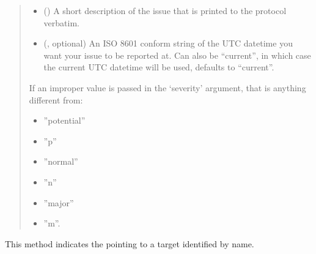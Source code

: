 \documentclass[letterpaper,10pt,english]{sphinxmanual}
\begin{document}
\begin{fulllineitems}
\begin{fulllineitems}
\begin{quote}
\begin{description}
\begin{itemize}
\begin{itemize}
\end{itemize}


\item {} 
\sphinxAtStartPar
{} () \textendash{} A short description of the issue that is printed to the protocol
verbatim.

\item {} 
\sphinxAtStartPar
{} (, optional) \textendash{} An ISO 8601 conform string of the UTC datetime you want your
issue to be reported at. Can also be “current”, in which case the
current UTC datetime will be used, defaults to “current”.

\end{itemize}

\sphinxAtStartPar
{} \textendash{} 
\sphinxAtStartPar
If an improper value is passed in the ‘severity’ argument, that is
anything different from:
\begin{itemize}
\item {} 
\sphinxAtStartPar
”potential”

\item {} 
\sphinxAtStartPar
”p”

\item {} 
\sphinxAtStartPar
”normal”

\item {} 
\sphinxAtStartPar
”n”

\item {} 
\sphinxAtStartPar
”major”

\item {} 
\sphinxAtStartPar
”m”.

\end{itemize}


\end{description}\end{quote}

\end{fulllineitems}


\begin{fulllineitems}
\label{\detokenize{autoapi/aop/aop/index:aop.aop.Session.point_to_name}}
\pysigstartsignatures
{}
\pysigstopsignatures
\sphinxAtStartPar
This method indicates the pointing to a target identified by name.


\end{fulllineitems}
\end{fulllineitems}
\end{document}
